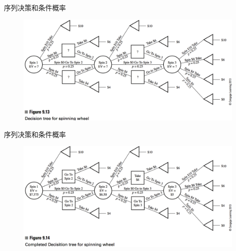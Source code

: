 \documentclass[UTF8]{ctexbeamer}
\begin{document}
\begin{frame}{序列决策和条件概率}
  
  \begin{figure}
    \includegraphics[width=\textwidth{}]{9_13.png}
  \end{figure}

\end{frame}

\begin{frame}{序列决策和条件概率}
  
  \begin{figure}
    \includegraphics[width=\textwidth{}]{9_14.png}
  \end{figure}

\end{frame}
\end{document}

